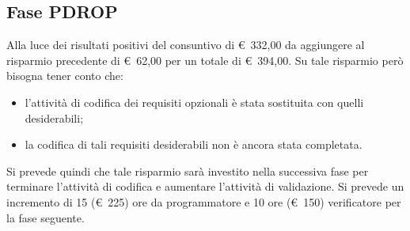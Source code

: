 \documentclass[../PianoProgetto.tex]{subfiles}
\begin{document}
	\subsection{Fase PDROP}
		Alla luce dei risultati positivi del consuntivo di \euro\ 332,00 da aggiungere al risparmio precedente di \euro\ 62,00 per un totale di \euro\ 394,00. Su tale risparmio però bisogna tener conto che:
		\begin{itemize} 
			\item l'attività di codifica dei requisiti opzionali è stata sostituita con quelli desiderabili;
			\item la codifica di tali requisiti desiderabili non è ancora stata completata.
		\end{itemize}
		Si prevede quindi che tale risparmio sarà investito nella successiva fase per terminare l'attività di codifica e aumentare l'attività di validazione. Si prevede un incremento di 15 (\euro\ 225) ore da programmatore e 10 ore (\euro\ 150) verificatore per la fase seguente.
		
\end{document}
